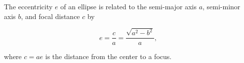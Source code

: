 The eccentricity $e$ of an ellipse is related to the semi-major axis $a$, semi-minor axis $b$, and focal distance $c$ by

$$e = \frac{c}{a} = \frac{\sqrt{a^2 - b^2}}{a},$$

where $c = ae$ is the distance from the center to a focus.
